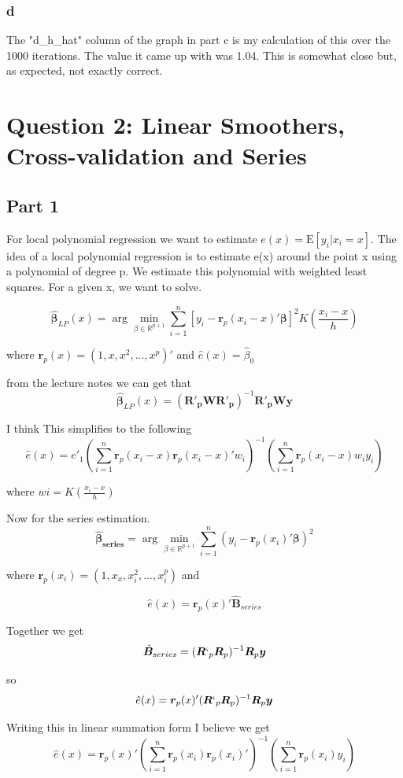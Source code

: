 \documentclass[11pt]{article}
\newcommand{\E}{\mathrm{E}}
\newcommand{\R}{\mathbb{R}}
\begin{document}
\subsubsection{d}
The "d\_h\_hat" column of the graph in part c is my calculation of this over the 1000 iterations. The value it came up with was 1.04. This is somewhat close but, as expected, not exactly correct. 

\section{Question 2: Linear Smoothers, Cross-validation and Series}

\subsection{Part 1}
For local polynomial regression we want to estimate $e(x) = \E[y_i|x_i = x]$. The idea of a local polynomial regression is to estimate e(x) around the point x using a polynomial of degree p. We estimate this polynomial with weighted least squares. For a given x, we want to solve. 

$$\hat{\bm{\beta}}_{LP}(x) = \arg \min_{\beta \in \R^{p+1}} \sum_{i=1}^{n}[y_i - \bm{r}_p(x_i - x)'\bm{\beta}]^2K(\frac{x_i-x}{h})
$$

where $ \bm{r}_p(x) = (1,x,x^2,...,x^p)'$ and $\hat{e}(x) = \hat{\beta}_0$

from the lecture notes we can get that 
$$\hat{\bm{\beta}}_{LP}(x) = (\bm{R'_pWR'_p})^{-1}\bm{R'_pWy}
$$

I think This simplifies to the following 
$$\hat{e}(x)= e'_1 \left( \sum_{i=1}^{n} \bm{r}_p(x_i-x)\bm{r}_p(x_i-x)'w_i\right)^{-1} \left( \sum_{i=1}^{n} \bm{r}_p(x_i - x)w_iy_i \right)
$$

where $ wi = K(\frac{x_i - x}{h}) $

Now for the series estimation. 
$$  \bm{\hat{\beta}_{series}} = \arg \min_{\beta \in \R^{p+1}} \sum_{i=1}^{n}(y_i -\bm{r}_p(x_i)'\bm{\beta})^2
	$$
	
where $ \bm{r}_p(x_i) = (1,x_x,x_i^2, ..., x_i^p)$ and 

$$\hat{e}(x) = \bm{r}_p(x)'\hat{\bm{B}}_{series}$$

Together we get 
$$ \hat{\bm{B}}_{series} = (\bm{R}`_p \bm{R}_p)^{-1}\bm{R}_p\bm{y}
$$

so 
$$\hat{e}(x) = \bm{r}_p(x)'(\bm{R}`_p \bm{R}_p)^{-1}\bm{R}_p\bm{y}$$

Writing this in linear summation form I believe we get 
$$\hat{e}(x) =  \bm{r}_p(x)' \left( \sum_{i=1}^{n}\bm{r}_p(x_i)\bm{r}_p(x_i)'\right)^{-1} \left( \sum_{i=1}^{n} \bm{r}_p(x_i)y_i \right)$$
\end{document}
